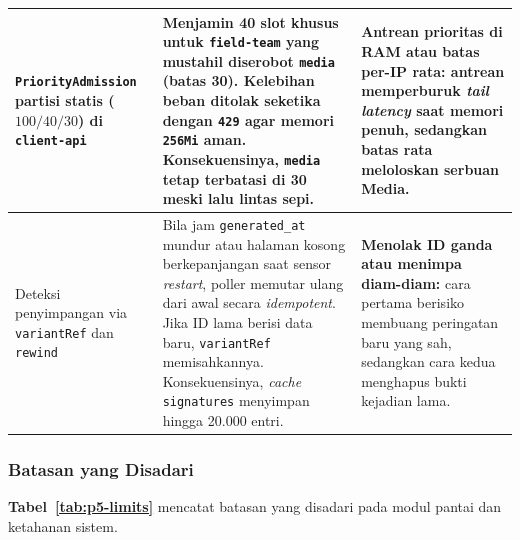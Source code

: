 \begin{small}
\begin{longtable}{@{} >{\raggedright\arraybackslash}p{3.4cm} >{\raggedright\arraybackslash}p{7.4cm} >{\raggedright\arraybackslash}p{4.0cm} @{}}
  \midrule
  \texttt{Priority\-Admission} partisi statis ($100/40/30$) di \texttt{client-api} & Menjamin 40 slot khusus untuk \texttt{field-team} yang mustahil diserobot \texttt{media} (batas 30). Kelebihan beban ditolak seketika dengan \texttt{429} agar memori \texttt{256Mi} aman. Konsekuensinya, \texttt{media} tetap terbatasi di 30 meski lalu lintas sepi. & \textbf{Antrean prioritas di RAM atau batas per-IP rata:} antrean memperburuk \textit{tail latency} saat memori penuh, sedangkan batas rata meloloskan serbuan Media. \\
  \midrule
  Deteksi penyimpangan via \texttt{variantRef} dan \texttt{rewind} & Bila jam \texttt{generated\_at} mundur atau halaman kosong berkepanjangan saat sensor \textit{restart}, poller memutar ulang dari awal secara \textit{idempotent}. Jika ID lama berisi data baru, \texttt{variantRef} memisahkannya. Konsekuensinya, \textit{cache} \texttt{signatures} menyimpan hingga 20.000 entri. & \textbf{Menolak ID ganda atau menimpa diam-diam:} cara pertama berisiko membuang peringatan baru yang sah, sedangkan cara kedua menghapus bukti kejadian lama. \\
\end{longtable}
\end{small}

\subsubsection{Batasan yang Disadari}

\textbf{Tabel~\ref{tab:p5-limits}} mencatat batasan yang disadari pada modul pantai dan ketahanan sistem.

